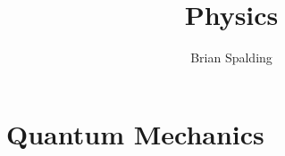 \documentclass[11pt]{book}
\begin{document}
    \title{Physics}
    \author{Brian Spalding}
    \maketitle

    \tableofcontents


    \part{Quantum Mechanics \label{part:QM}}

	


    
\end{document}

